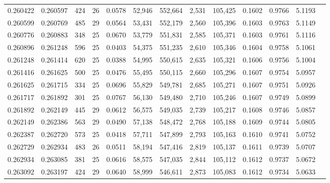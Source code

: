 \begin{tabular}{rrrrrrrrrrrrr}
0.260422 & 0.260597 &   424 &  26 &                                     0.0578 &  52,946 & 552,664 &   2,531 & 105,425 & 0.1602 & 0.9766 & 5.1193 \\
0.260599 & 0.260769 &   485 &  29 &                                     0.0564 &  53,431 & 552,179 &   2,560 & 105,396 & 0.1603 & 0.9763 & 5.1149 \\
0.260776 & 0.260883 &   348 &  25 &                                     0.0670 &  53,779 & 551,831 &   2,585 & 105,371 & 0.1603 & 0.9761 & 5.1116 \\
0.260896 & 0.261248 &   596 &  25 &                                     0.0403 &  54,375 & 551,235 &   2,610 & 105,346 & 0.1604 & 0.9758 & 5.1061 \\
0.261248 & 0.261414 &   620 &  25 &                                     0.0388 &  54,995 & 550,615 &   2,635 & 105,321 & 0.1606 & 0.9756 & 5.1004 \\
0.261416 & 0.261625 &   500 &  25 &                                     0.0476 &  55,495 & 550,115 &   2,660 & 105,296 & 0.1607 & 0.9754 & 5.0957 \\
0.261625 & 0.261715 &   334 &  25 &                                     0.0696 &  55,829 & 549,781 &   2,685 & 105,271 & 0.1607 & 0.9751 & 5.0926 \\
0.261717 & 0.261892 &   301 &  25 &                                     0.0767 &  56,130 & 549,480 &   2,710 & 105,246 & 0.1607 & 0.9749 & 5.0899 \\
0.261892 & 0.262149 &   445 &  29 &                                     0.0612 &  56,575 & 549,035 &   2,739 & 105,217 & 0.1608 & 0.9746 & 5.0857 \\
0.262149 & 0.262386 &   563 &  29 &                                     0.0490 &  57,138 & 548,472 &   2,768 & 105,188 & 0.1609 & 0.9744 & 5.0805 \\
0.262387 & 0.262720 &   573 &  25 &                                     0.0418 &  57,711 & 547,899 &   2,793 & 105,163 & 0.1610 & 0.9741 & 5.0752 \\
0.262729 & 0.262934 &   483 &  26 &                                     0.0511 &  58,194 & 547,416 &   2,819 & 105,137 & 0.1611 & 0.9739 & 5.0707 \\
0.262934 & 0.263085 &   381 &  25 &                                     0.0616 &  58,575 & 547,035 &   2,844 & 105,112 & 0.1612 & 0.9737 & 5.0672 \\
0.263092 & 0.263197 &   424 &  29 &                                     0.0640 &  58,999 & 546,611 &   2,873 & 105,083 & 0.1612 & 0.9734 & 5.0633 \\

\end{tabular}
